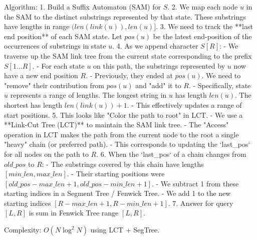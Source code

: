 \documentclass[11pt]{article}
\begin{document}
Algorithm:
1. Build a Suffix Automaton (SAM) for $S$.
2. We map each node $u$ in the SAM to the distinct substrings represented by that state. These substrings have lengths in range $(len(link(u)), len(u)]$.
3. We need to track the **last end position** of each SAM state. Let $pos(u)$ be the latest end-position of the occurrences of substrings in state $u$.
4. As we append character $S[R]$:
    - We traverse up the SAM link tree from the current state corresponding to the prefix $S[1 \dots R]$.
    - For each state $u$ on this path, the substrings represented by $u$ now have a new end position $R$.
    - Previously, they ended at $pos(u)$. We need to "remove" their contribution from $pos(u)$ and "add" it to $R$.
    - Specifically, state $u$ represents a range of lengths. The longest string in $u$ has length $len(u)$. The shortest has length $len(link(u)) + 1$.
    - This effectively updates a range of start positions.
5. This looks like "Color the path to root" in LCT.
    - We use a **Link-Cut Tree (LCT)** to maintain the SAM link tree.
    - The "Access" operation in LCT makes the path from the current node to the root a single "heavy" chain (or preferred path).
    - This corresponds to updating the `last\_pos` for all nodes on the path to $R$.
6. When the `last\_pos` of a chain changes from $old\_pos$ to $R$:
    - The substrings covered by this chain have lengths $[min\_len, max\_len]$.
    - Their starting positions were $[old\_pos - max\_len + 1, old\_pos - min\_len + 1]$.
    - We subtract 1 from these starting indices in a Segment Tree / Fenwick Tree.
    - We add 1 to the new starting indices $[R - max\_len + 1, R - min\_len + 1]$.
7. Answer for query $[L, R]$ is sum in Fenwick Tree range $[L, R]$.

Complexity: $O(N \log^2 N)$ using LCT + SegTree.
\end{document}
